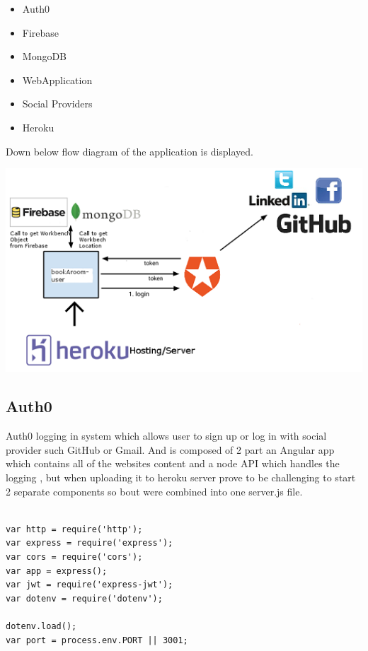 \begin{itemize}
	\item Auth0
	\item Firebase
	\item MongoDB
	\item WebApplication 
	\item Social Providers
	\item Heroku
\end{itemize}
\bigbreak

Down below flow diagram of the application is displayed.

\begin{center}    
	\includegraphics{img/userFlow.png}
\end{center}
\bigbreak


\subsection{Auth0}
Auth0 logging in system which allows user to sign up or log in with social provider such GitHub or Gmail. And is composed of 2 part an Angular app which contains all of the websites content and a node API which handles the logging , but when uploading it to heroku server prove to be challenging to start 2 separate components so bout were combined into one server.js file.
\bigbreak

\begin{verbatim}

var http = require('http');
var express = require('express');
var cors = require('cors');
var app = express();
var jwt = require('express-jwt');
var dotenv = require('dotenv');

dotenv.load();
var port = process.env.PORT || 3001;

\end{verbatim}

